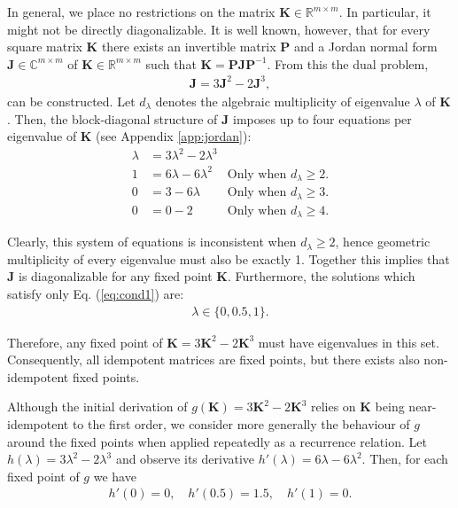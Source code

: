 \documentclass{article}
\theoremstyle{plain}
\theoremstyle{definition}
\theoremstyle{remark}
\newcommand{\vJ}{\mathbf{J}}
\newcommand{\vK}{\mathbf{K}}
\newcommand{\vP}{\mathbf{P}}
\begin{document}
In general, we place no restrictions on the matrix ${\vK \in \mathbb{R}^{m \times m}}$. In particular, it might not be directly diagonalizable. It is well known, however, that for every square matrix $\vK$ there exists an invertible matrix $\vP$ and a Jordan normal form \cite{jordan-form} $\vJ \in \mathbb{C}^{m \times m}$ of ${\vK \in \mathbb{R}^{m \times m}}$ such that ${\vK = \vP \vJ \vP^{-1}}$. From this the dual problem,
\begin{align}
    \vJ = 3 \vJ^2 - 2 \vJ^3,
\end{align}
can be constructed. Let $d_\lambda$ denotes the algebraic multiplicity of eigenvalue $\lambda$ of $\vK$. Then, the block-diagonal structure of $\vJ$ imposes up to four equations per eigenvalue of $\vK$ (see Appendix \ref{app:jordan}):
\begin{align}
    \lambda & = 3\lambda^2 - 2\lambda^3 & \label{eq:cond1}                                   \\
    1       & = 6\lambda - 6\lambda^2   & \text{Only when $d_\lambda\geq2$.}\label{eq:cond2} \\
    0       & = 3 - 6\lambda            & \text{Only when $d_\lambda\geq3$.}\label{eq:cond3} \\
    0       & = 0 - 2                   & \text{Only when $d_\lambda\geq4$.}\label{eq:cond4}
\end{align}

Clearly, this system of equations is inconsistent when ${d_{\lambda} \geq 2}$, hence geometric multiplicity of every eigenvalue must also be exactly 1. Together this implies that $\vJ$ is diagonalizable for any fixed point $\vK$. Furthermore, the solutions which satisfy only Eq. (\ref{eq:cond1}) are:
%
\begin{align}
    \lambda \in \{0, 0.5, 1\}.
\end{align}

Therefore, any fixed point of ${\vK = 3 \vK^2 - 2 \vK^3}$ must have eigenvalues in this set. Consequently, all idempotent matrices are fixed points, but there exists also non-idempotent fixed points.

Although the initial derivation of ${g(\vK) = 3 \vK^2 - 2 \vK^3}$ relies on $\vK$ being near-idempotent to the first order, we consider more generally the behaviour of $g$ around the fixed points when applied repeatedly as a recurrence relation. Let ${h(\lambda) = 3\lambda^2 - 2\lambda^3}$ and observe its derivative ${h'(\lambda) = 6\lambda - 6\lambda^2}$. Then, for each fixed point of $g$ we have
\begin{align}
    h'(0) = 0, \quad h'(0.5) = 1.5, \quad h'(1) = 0.
\end{align}
\end{document}
